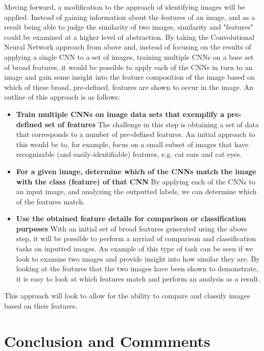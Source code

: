 \documentclass[12pt, titlepage]{article}
\begin{document}
Moving forward, a modification to the approach of identifying images will be applied. Instead of gaining information about the
features of an image, and as a result being able to judge the similarity of two images, similarity and "features" could
be examined at a higher level of abstraction. By taking the Convolutional Neural Network approach from above and, instead of focusing on the results of applying a single CNN to a set of images, training multiple CNNs on
a base set of broad features, it would be possible to apply each of the CNNs in turn to an image and gain some
insight into the feature composition of the image based on which of these broad, pre-defined, features are shown to
occur in the image. An outline of this approach is as follows: \\
\begin{itemize}
  \item \textbf{Train multiple CNNs on image data sets that exemplify a pre-defined set of features}
  		The challenge in this step is obtaining a set of data that corresponds to a number of pre-defined
  		features. An initial approach to this would be to, for example, focus on a small subset of images that
  		have recognizable (and easily-identifiable) features, e.g. cat ears and cat eyes.
  \item \textbf{For a given image, determine which of the CNNs match the image with the class (feature) of that CNN}
  		By applying each of the CNNs to an input image, and analyzing the outputted labels, we can determine
  		which of the features match.
  \item \textbf{Use the obtained feature details for comparison or classification purposes}
  		With an initial set of broad features generated using the above step, it will be possible to perform
  		a myriad of comparison and classification tasks on inputted images. An example of this type of task can be seen
  		if we look to examine two images and provide insight into how similar they are. By looking at the features that the two images
  		have been shown to demonstrate, it is easy to look at which features match and perform an analysis as a result.
\end{itemize}

This approach will look to allow for the ability to compare and classify images based on their features.

\section{Conclusion and Commments}
\end{document}
